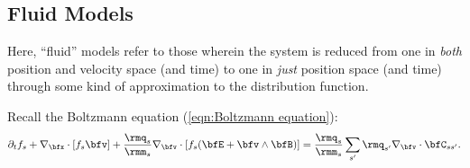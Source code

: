 \subsection{Fluid Models}\label{cha:fluid models}


    \line

    \begin{definition}\label{def:fluid model}
        Here, ``fluid'' models refer to those wherein the system is reduced from one in \emph{both} position and velocity space (and time) to one in \emph{just} position space (and time) through some kind of approximation to the distribution function.
    \end{definition}

    \line
    
    Recall the Boltzmann equation (\ref{eqn:Boltzmann equation}):
    \begin{equation*}
        \partial_{t}f_{s} + \nabla_{\bfx}\cdot[f_{s}\bfv] + \frac{\rmq_{s}}{\rmm_{s}}\nabla_{\bfv}\cdot[f_{s}(\bfE + \bfv\wedge\bfB)]  =  \frac{\rmq_{s}}{\rmm_{s}}\sum_{s'}\rmq_{s'}\nabla_{\bfv}\cdot\bfC_{ss'}.
    \end{equation*}


    
    
    
    
    